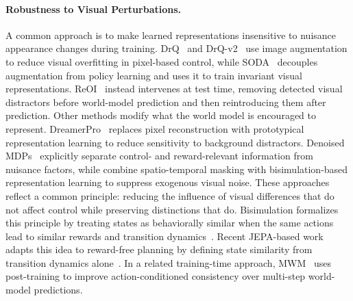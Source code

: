 \paragraph{Robustness to Visual Perturbations.}
A common approach is to make learned representations insensitive to nuisance
appearance changes during training. DrQ~\citep{kostrikov2020drq} and
DrQ-v2~\citep{yarats2022drqv2} use image augmentation to reduce visual
overfitting in pixel-based control, while SODA~\citep{hansen2021soda}
decouples augmentation from policy learning and uses it to train invariant
visual representations. ReOI~\citep{chen2025reoi} instead intervenes at test
time, removing detected visual distractors before world-model prediction and
then reintroducing them after prediction.
Other methods modify what the world model is encouraged to represent.
DreamerPro~\citep{deng2022dreamerpro} replaces pixel reconstruction with
prototypical representation learning to reduce sensitivity to background
distractors. Denoised MDPs~\citep{wang2022denoisedmdps} explicitly separate
control- and reward-relevant information from nuisance factors, while
\citet{sun2024latentrobustwm} combine spatio-temporal masking with
bisimulation-based representation learning to suppress exogenous visual noise.
These approaches reflect a common principle: reducing the influence of visual
differences that do not affect control while preserving distinctions that do.
Bisimulation formalizes this principle by treating states as behaviorally
similar when the same actions lead to similar rewards and transition
dynamics~\citep{gelada2019deepmdp,zhang2021dbc,bsmpc}. Recent JEPA-based work
adapts this idea to reward-free planning by defining state similarity from
transition dynamics alone~\citep{toso2026bisimjepa}.
In a related training-time approach, MWM~\citep{yan2026mwm} uses post-training to improve action-conditioned
consistency over multi-step world-model predictions.


